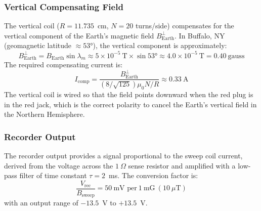 \subsubsection*{Vertical Compensating Field}
 
The vertical coil ($R = 11.735$~cm, $N = 20$ turns/side) compensates for the vertical
component of the Earth's magnetic field $B_{\text{Earth}}^{\perp}$. In Buffalo, NY
(geomagnetic latitude $\approx 53°$), the vertical component is approximately:
\begin{equation}
    B_{\text{Earth}}^{\perp} = B_{\text{Earth}}\sin\lambda_m
    \approx 5\times10^{-5}\ \text{T} \times \sin 53°
    \approx 4.0\times10^{-5}\ \text{T} = 0.40\ \text{gauss}
\end{equation}
The required compensating current is:
\begin{equation}
    I_{\text{comp}} = \frac{B_{\text{Earth}}^{\perp}}{\left(8/\sqrt{125}\right)\mu_0 N/R}
    \approx 0.33\ \text{A}
\end{equation}
The vertical coil is wired so that the field points downward when the red plug is in the
red jack, which is the correct polarity to cancel the Earth's vertical field in the
Northern Hemisphere.
 
\subsubsection*{Recorder Output}
 
The recorder output provides a signal proportional to the sweep coil current, derived
from the voltage across the $1\ \Omega$ sense resistor and amplified with a low-pass
filter of time constant $\tau = 2$~ms. The conversion factor is:
\begin{equation}
    \frac{V_{\text{rec}}}{B_{\text{sweep}}} = 50\ \text{mV per}\ 1\ \text{mG}\ (10\ \mu\text{T})
\end{equation}
with an output range of $-13.5$~V to $+13.5$~V.